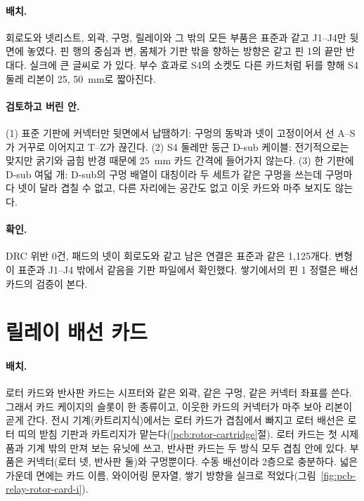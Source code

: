 \paragraph{배치.} 회로도와 넷리스트, 외곽, 구멍, 릴레이와 그 밖의 모든 부품은 표준과 같고 J1--J4만 뒷면에 놓였다.
핀 행의 중심과 변, 몸체가 기판 밖을 향하는 방향은 같고 핀 1의 끝만 반대다. 실크에 큰 글씨로 가
있다. 부수 효과로 S4의 소켓도 다른 카드처럼 뒤를 향해 S4 둘레 리본이 25, 50~mm로 짧아진다.

\paragraph{검토하고 버린 안.} (1) 표준 기판에 커넥터만 뒷면에서 납땜하기: 구멍의 동박과 넷이 고정이어서 선 A--S가
거꾸로 이어지고 T--Z가 끊긴다. (2) S4 둘레만 둥근 D-sub 케이블: 전기적으로는 맞지만 굵기와 굽힘 반경 때문에 25~mm
카드 간격에 들어가지 않는다. (3) 한 기판에 D-sub 여덟 개: D-sub의 구멍 배열이 대칭이라 두 세트가 같은 구멍을 쓰는데
구멍마다 넷이 달라 겹칠 수 없고, 다른 자리에는 공간도 없고 이웃 카드와 마주 보지도 않는다.

\paragraph{확인.} DRC 위반 0건, 패드의 넷이 회로도와 같고 남은 연결은 표준과 같은 1,125개다. 변형이 표준과 J1--J4 밖에서
같음을 기판 파일에서 확인했다. 쌓기에서의 핀 1 정렬은 배선 카드의 검증이 본다.


\section{릴레이 배선 카드}\label{pcb:wiring-cards}

\paragraph{배치.} 로터 카드와 반사판 카드는 시프터와 같은 외곽, 같은 구멍, 같은 커넥터 좌표를 쓴다. 그래서 카드
케이지의 슬롯이 한 종류이고, 이웃한 카드의 커넥터가 마주 보아 리본이 곧게 간다. 전시 기계(카트리지식)에서는 로터 카드가
겹침에서 빠지고 로터 배선은 로터 띠의 받침 기판과 카트리지가 맡는다(\ref{pcb:rotor-cartridge}절). 로터 카드는 첫
시제품과 기계 밖의 만져 보는 유닛에 쓰고, 반사판 카드는 두 방식 모두 겹침 안에 있다. 부품은 커넥터(로터 넷, 반사판 둘)와
구멍뿐이다. 수동 배선이라 2층으로 충분하다. 넓은 가운데 면에는 카드 이름, 와이어링 문자열, 쌓기 방향을 실크로 적었다(그림~\ref{fig:pcb-relay-rotor-card-i}).

